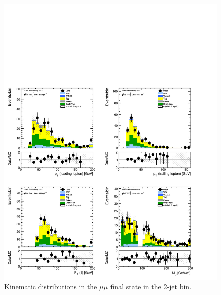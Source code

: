 \begin{figure}[!hbtp]
\centering
\includegraphics[width=1\textwidth]{figures/ww_analysis20_0_ALL_mm_2j.pdf}
\caption{Kinematic distributions in the $\mu\mu$ final state in the 2-jet bin.}
\label{fig:xs_kinematics_mm_2j}
\end{figure}
